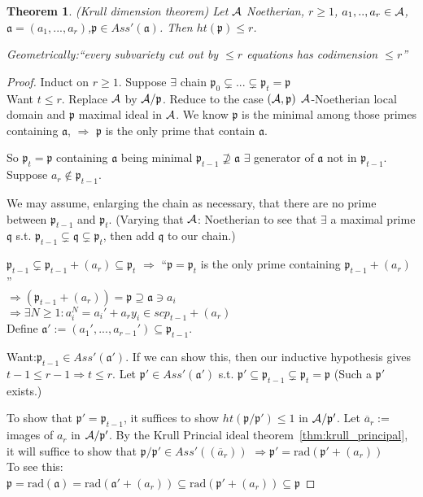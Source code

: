 \documentclass[11pt]{article}
\newtheorem{thm}{Theorem}[section]
\newcommand{\sca}{{\mathfrak a}}
\newcommand{\scp}{{\mathfrak p}}
\newcommand{\scq}{\mathfrak q}
\newcommand{\cala}{{\cal A}}
\newcommand{\Lrta}{\Longrightarrow}
\begin{document}
\begin{thm}\label{thm:Krull_dimension}
(Krull dimension theorem)
Let $\cala$ Noetherian, $r\geq 1$, $a_1,..,a_r\in\cala$, $\sca=(a_1,...,a_r)$,$\scp\in Ass'(\sca)$. Then $ht(\scp)\leq r$.

Geometrically:``every subvariety cut out by $\leq r$ equations has codimension $\leq r$''

\end{thm}
\begin{proof}
Induct on $r\geq 1$. Suppose $\exists $ chain $\scp_0\subsetneq...\subsetneq\scp_t=\scp$\\
Want $t\leq r$. Replace $\cala$ by $\cala/\scp$. Reduce to the case $(\cala,\scp)$ $\cala$-Noetherian local domain and $\scp$ maximal ideal in $\cala$. We know $\scp$ is the minimal among those primes containing $\sca$, $\Lrta$ $\scp$ is the only prime that contain $\sca$.

So $\scp_t=\scp$ containing $\sca$ being minimal $\scp_{t-1}\nsupseteq\sca$ $\exists $ generator of $\sca$ not in $\scp_{t-1}$. Suppose $a_r\notin\scp_{t-1}$.

We may assume, enlarging the chain as necessary, that there are no prime between $\scp_{t-1}$ and $\scp_t$. (Varying that $\cala$: Noetherian to see that $\exists$ a maximal prime $\scq$ s.t. $\scp_{t-1}\subsetneq \scq\subsetneq \scp_t$, then add $\scq$ to our chain.)

$\scp_{t-1}\subsetneq \scp_{t-1}+(a_r)\subseteq\scp_t$ $\Lrta$ ``$\scp=\scp_t$ is the only prime containing $\scp_{t-1}+(a_r)$''\\
$\Lrta(\scp_{t-1}+(a_r))=\scp\supseteq \sca\ni a_i$\\
$\Lrta\exists N\geq 1: a_i^N=a_i'+a_r y_i\in scp_{t-1}+(a_r)$\\
Define $\sca':=(a_1',...,a_{r-1}')\subseteq \scp_{t-1}$.

Want:$\scp_{t-1}\in Ass'(\sca')$. If we can show this, then our inductive hypothesis gives $t-1\leq r-1\Lrta t\leq r$. Let $\scp'\in Ass'(\sca')$ s.t. $\scp'\subseteq \scp_{t-1}\subsetneq \scp_t=\scp$ (Such a $\scp'$ exists.)

To show that $\scp'=\scp_{t-1}$, it suffices to show $ht(\scp/\scp')\leq 1$ in $\cala/\scp'$. Let $\overline{a}_r:=$ images of $a_r$ in $\cala/\scp'$.
By the Krull Princial ideal theorem~\ref{thm:krull_principal}, it will suffice to show that 
$\scp/\scp'\in Ass'((\overline{a}_r))$ $\Lrta \scp'=\text{rad}(\scp'+(a_r))$\\
To see this:\\
$\scp=\text{rad}(\sca)=\text{rad}(\sca'+(a_r))\subseteq \text{rad}(\scp'+(a_r))\subseteq \scp$
\end{proof}
\end{document}
